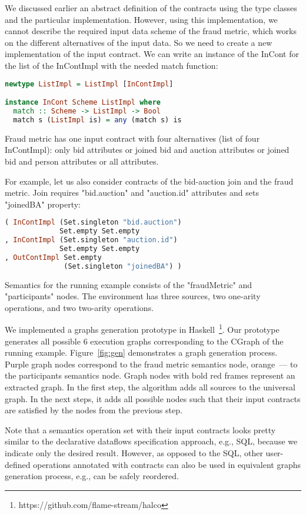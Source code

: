We discussed earlier an abstract definition of the contracts using the type classes and the particular implementation.
However, using this implementation, we cannot describe the required input data scheme of the fraud metric, which works on the different alternatives of the input data.
So we need to create a new implementation of the input contract.
We can write an instance of the InCont for the list of the InContImpl with the needed match function:

\begin{lstlisting}[language=Haskell]
newtype ListImpl = ListImpl [InContImpl]

instance InCont Scheme ListImpl where
  match :: Scheme -> ListImpl -> Bool
  match s (ListImpl is) = any (match s) is
\end{lstlisting}

Fraud metric has one input contract with four alternatives (list of four InContImpl):
only bid attributes
or joined bid and auction attributes
or joined bid and person attributes
or all attributes.

For example, let us also consider contracts of the bid-auction join and the fraud metric.
Join requires "bid.auction" and "auction.id" attributes and sets "joinedBA" property:
\begin{lstlisting}[language=Haskell]
( InContImpl (Set.singleton "bid.auction")
             Set.empty Set.empty
, InContImpl (Set.singleton "auction.id")
             Set.empty Set.empty
, OutContImpl Set.empty
              (Set.singleton "joinedBA") )
\end{lstlisting}

Semantics for the running example consists of the "fraudMetric" and "participants" nodes.
The environment has three sources, two one-arity operations, and two two-arity operations.

We implemented a graphs generation prototype in Haskell~\footnote{https://github.com/flame-stream/halco}.
Our prototype generates all possible 6 execution graphs corresponding to the CGraph of the running example. Figure~\ref{fig:gen} demonstrates a graph generation process.
Purple graph nodes correspond to the fraud metric semantics node, orange~--- to the participants semantics node.
Graph nodes with bold red frames represent an extracted graph.
In the first step, the algorithm adds all sources to the universal graph.
In the next steps, it adds all possible nodes such that their input contracts are satisfied by the nodes from the previous step.

Note that a semantics operation set with their input contracts looks pretty similar to the declarative dataflows specification approach, e.g., SQL, because we indicate only the desired result.
However, as opposed to the SQL, other user-defined operations annotated with contracts can also be used in equivalent graphs generation process, e.g., can be safely reordered.
